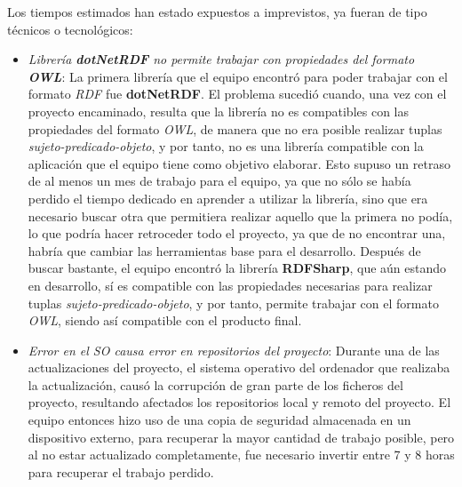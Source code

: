 
Los tiempos estimados han estado expuestos a imprevistos, ya fueran de tipo técnicos o tecnológicos:

\begin{itemize}
    \item \textit{Librería \textnormal{\textbf{dotNetRDF}} no permite trabajar con propiedades del formato \textnormal{\textbf{OWL}}}:
    La primera librería que el equipo encontró para poder trabajar con el formato \textit{RDF} fue \textbf{dotNetRDF}. El problema 
    sucedió cuando, una vez con el proyecto encaminado, resulta que la librería no es compatibles con las propiedades del formato \textit{OWL}, 
    de manera que no era posible realizar tuplas \textit{sujeto-predicado-objeto}, y por tanto, no es una librería compatible con la aplicación que 
    el equipo tiene como objetivo elaborar. Esto supuso un retraso de al menos un mes de trabajo para el equipo, ya que no sólo se había perdido 
    el tiempo dedicado en aprender a utilizar la librería, sino que era necesario buscar otra que permitiera realizar aquello que la primera no podía, 
    lo que podría hacer retroceder todo el proyecto, ya que de no encontrar una, habría que cambiar las herramientas base para el desarrollo.
    Después de buscar bastante, el equipo encontró la librería \textbf{RDFSharp}, que aún estando en desarrollo, sí es compatible con las propiedades 
    necesarias para realizar tuplas \textit{sujeto-predicado-objeto}, y por tanto, permite trabajar con el formato \textit{OWL}, siendo así compatible 
    con el producto final.

    \item \textit{Error en el SO causa error en repositorios del proyecto}: Durante una de las actualizaciones del proyecto, el sistema operativo del 
    ordenador que realizaba la actualización, causó la corrupción de gran parte de los ficheros del proyecto, resultando afectados los repositorios local 
    y remoto del proyecto. El equipo entonces hizo uso de una copia de seguridad almacenada en un dispositivo externo, para recuperar la mayor cantidad 
    de trabajo posible, pero al no estar actualizado completamente, fue necesario invertir entre 7 y 8 horas para recuperar el trabajo perdido.
\end{itemize}









